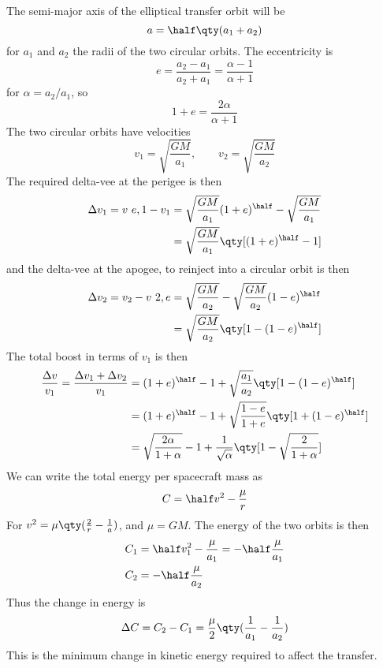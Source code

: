 The semi-major axis of the elliptical transfer orbit will be 
\[ a = \half \qty( a_1 + a_2) \] for $a_1$ and $a_2$ the radii of the
two circular orbits. The eccentricity is
\[ e = \frac{a_2 - a_1}{a_2 + a_1} = \frac{\alpha-1}{\alpha+1} \] for
$\alpha = a_2/a_1$, so
\[ 1 + e = \frac{2 \alpha}{\alpha+1} \]
The two circular orbits have velocities
\[ v_1 = \sqrt{\frac{GM}{a_1}}, \qquad v_2 = \sqrt{\frac{GM}{a_2}} \]
The required delta-vee at the perigee is then
\begin{align*}
  \Delta v_1 = v~{e,1} - v_1 &= \sqrt{\frac{GM}{a_1}} (1+e)^{\half} - \sqrt{\frac{GM}{a_1}} \\
&= \sqrt{\frac{GM}{a_1}} \qty[ (1+e)^{\half} -1 ]
\end{align*}
and the delta-vee at the apogee, to reinject into a circular orbit is then
\begin{align*}
  \Delta v_2 = v_2 - v~{2,e} &= \sqrt{\frac{GM}{a_2}} - \sqrt{\frac{GM}{a_2}} (1-e)^{\half} \\
&= \sqrt{\frac{GM}{a_2}} \qty[ 1 - (1-e)^{\half}]
\end{align*}
The total boost in terms of $v_1$ is then
\begin{align*}
  \frac{\Delta v}{v_1} = \frac{\Delta v_1 + \Delta v_2}{v_1} &=
    (1+e)^{\half} - 1 + \sqrt{\frac{a_1}{a_2}} \qty[1-(1-e)^{\half}] \\
 &= (1+e)^{\half} - 1 + \sqrt{\frac{1-e}{1+e}} \qty[ 1 + (1-e)^{\half}] \\
 &= \sqrt{\frac{2 \alpha}{1+\alpha}} - 1 + \frac{1}{\sqrt{\alpha}} \qty[ 1 - \sqrt{\frac{2}{1+\alpha}}]
\end{align*}
We can write the total energy per spacecraft mass as
\[ C = \half v^2 - \frac{\mu}{r} \] For $v^2 = \mu \qty(\frac{2}{r} -
\frac{1}{a})$, and $\mu=GM$.
The energy of the two orbits is then
\begin{align*}
  C_1 &= \half v_1^2 - \frac{\mu}{a_1} = - \half \frac{\mu}{a_1} \\
  C_2 &= - \half \frac{\mu}{a_2}
\end{align*}
Thus the change in energy is
\begin{equation}
  \label{eq:3}
  \Delta C = C_2 - C_1 = \frac{\mu}{2} \qty( \frac{1}{a_1} - \frac{1}{a_2})
\end{equation}
This is the minimum change in kinetic energy required to affect the transfer.

